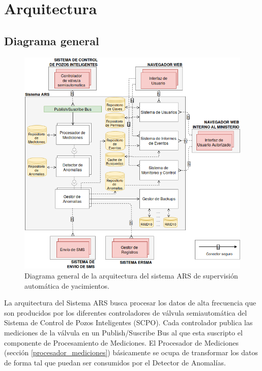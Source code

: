 \documentclass{article}
\theoremstyle{definition}
\theoremstyle{remark}
\begin{document}
\pagebreak

\section{Arquitectura}

\subsection{Diagrama general}

\begin{figure}[H]
  \centerline{\includegraphics[scale=0.8]{figures/architecture.png}}
  \caption{Diagrama general de la arquitectura del sistema ARS de supervisión automática de yacimientos.}
\end{figure}

La arquitectura del Sistema ARS busca procesar los datos de alta frecuencia que son producidos por los diferentes controladores de válvula semiautomática del Sistema de Control de Pozos Inteligentes (SCPO). Cada controlador publica las mediciones de la válvula en un Publish/Suscribe Bus al que esta suscripto el componente de Procesamiento de Mediciones. El Procesador de Mediciones (sección \ref{procesador_mediciones}) básicamente se ocupa de transformar los datos de forma tal que puedan ser consumidos por el Detector de Anomalías.
\end{document}
